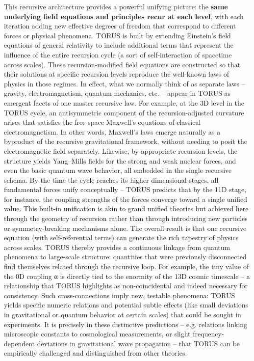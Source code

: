 \documentclass[
]{article}
\begin{document}
This recursive architecture provides a powerful unifying picture: the
\textbf{same underlying field equations and principles recur at each
level}, with each iteration adding new effective degrees of freedom that
correspond to different forces or physical phenomena. TORUS is built by
extending Einstein's field equations of general relativity to include
additional terms that represent the influence of the entire recursion
cycle (a sort of self-interaction of spacetime across scales). These
recursion-modified field equations are constructed so that their
solutions at specific recursion levels reproduce the well-known laws of
physics in those regimes. In effect, what we normally think of as
separate laws -- gravity, electromagnetism, quantum mechanics, etc. --
appear in TORUS as emergent facets of one master recursive law. For
example, at the 3D level in the TORUS cycle, an antisymmetric component
of the recursion-adjusted curvature arises that satisfies the free-space
Maxwell's equations of classical electromagnetism. In other words,
Maxwell's laws emerge naturally as a byproduct of the recursive
gravitational framework, without needing to posit the electromagnetic
field separately. Likewise, by appropriate recursion levels, the
structure yields Yang--Mills fields for the strong and weak nuclear
forces, and even the basic quantum wave behavior, all embedded in the
single recursive schema. By the time the cycle reaches its
higher-dimensional stages, all fundamental forces unify conceptually --
TORUS predicts that by the 11D stage, for instance, the coupling
strengths of the forces converge toward a single unified value. This
built-in unification is akin to grand unified theories but achieved here
through the geometry of recursion rather than through introducing new
particles or symmetry-breaking mechanisms alone. The overall result is
that one recursive equation (with self-referential terms) can generate
the rich tapestry of physics across scales. TORUS thereby provides a
continuous linkage from quantum phenomena to large-scale structure:
quantities that were previously disconnected find themselves related
through the recursive loop. For example, the tiny value of the 0D
coupling α is directly tied to the enormity of the 13D cosmic timescale
-- a relationship that TORUS highlights as non-coincidental and indeed
necessary for consistency. Such cross-connections imply new, testable
phenomena: TORUS yields specific numeric relations and potential subtle
effects (like small deviations in gravitational or quantum behavior at
certain scales) that could be sought in experiments. It is precisely in
these distinctive predictions -- e.g. relations linking microscopic
constants to cosmological measurements, or slight frequency-dependent
deviations in gravitational wave propagation -- that TORUS can be
empirically challenged and distinguished from other theories.
\end{document}
